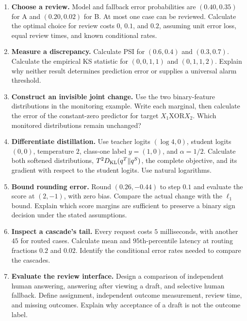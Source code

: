 \begin{enumerate}
\item \textbf{Choose a review.} Model and fallback error probabilities are $(0.40,0.35)$ for A and $(0.20,0.02)$ for B. At most one case can be reviewed. Calculate the optimal choice for review costs $0$, $0.1$, and $0.2$, assuming unit error loss, equal review times, and known conditional rates.\par

\item \textbf{Measure a discrepancy.} Calculate PSI for $(0.6,0.4)$ and $(0.3,0.7)$. Calculate the empirical KS statistic for $(0,0,1,1)$ and $(0,1,1,2)$. Explain why neither result determines prediction error or supplies a universal alarm threshold.\par

\newpage
\item \textbf{Construct an invisible joint change.} Use the two binary-feature distributions in the monitoring example. Write each marginal, then calculate the error of the constant-zero predictor for target $X_1\mathbin{\mathrm{XOR}}X_2$. Which monitored distributions remain unchanged?\par

\item \textbf{Differentiate distillation.} Use teacher logits $(\log4,0)$, student logits $(0,0)$, temperature $2$, class-one label $y=(1,0)$, and $\alpha=1/2$. Calculate both softened distributions, $T^2D_{\rm KL}(q^T\|q^S)$, the complete objective, and its gradient with respect to the student logits. Use natural logarithms.\par

\item \textbf{Bound rounding error.} Round $(0.26,-0.44)$ to step $0.1$ and evaluate the score at $(2,-1)$, with zero bias. Compare the actual change with the $\ell_1$ bound. Explain which score margins are sufficient to preserve a binary sign decision under the stated assumptions.\par

\item \textbf{Inspect a cascade's tail.} Every request costs $5$ milliseconds, with another $45$ for routed cases. Calculate mean and $95$th-percentile latency at routing fractions $0.2$ and $0.02$. Identify the conditional error rates needed to compare the cascades.\par

\item \textbf{Evaluate the review interface.} Design a comparison of independent human answering, answering after viewing a draft, and selective human fallback. Define assignment, independent outcome measurement, review time, and missing outcomes. Explain why acceptance of a draft is not the outcome label.\par


\end{enumerate}

